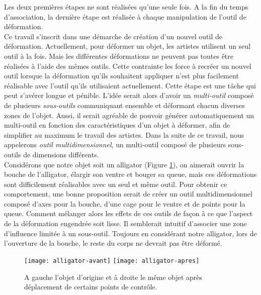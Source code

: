 Les deux premières étapes ne sont réalisées qu'une seule fois. A la fin du
temps d'association, la dernière étape est réalisée à chaque manipulation de
l'outil de déformation. \\

Ce travail s'inscrit dans une démarche de création d'un nouvel outil de
déformation. Actuellement, pour déformer un objet, les artistes utilisent un
seul outil à la fois. Mais les différentes déformations ne peuvent pas toutes
être réalisées à l'aide des mêmes outils. Cette contrainte les force à recréer
un nouvel outil lorsque la déformation qu'ils souhaitent appliquer n'est plus
facilement réalisable avec l'outil qu'ils utilisaient actuellement. Cette
étape est une tâche qui peut s'avérer longue et pénible. L'idée serait alors
d'avoir un \textit {multi-outil} composé de plusieurs \textit{sous-outils}
communiquant ensemble et déformant chacun diverses zones de l'objet. Aussi, il
serait agréable de pouvoir générer automatiquement un multi-outil en fonction
des caractéristiques d'un objet à déformer, afin de simplifier au maximum le
travail des artistes. Dans la suite de ce travail, nous appelerons
\textit{outil multidimensionnel}, un multi-outil composé de plusieurs sous-
outils de dimensions différents. \\

Considérons que notre objet soit un alligator (Figure \ref{INTall}), on
aimerait ouvrir la bouche de l'alligator, élargir son ventre et bouger sa
queue, mais ces déformations sont difficilement réalisables avec un seul et
même outil. Pour obtenir ce comportement, une bonne proposition serait de
créer un outil multidimensionnel composé d'axes pour la bouche, d'une cage
pour le ventre et de points pour la queue. Comment mélanger alors les effets
de ces outils de façon à ce que l'aspect de la déformation engendrée soit
lisse. Il semblerait intuitif d'associer une zone d'influence limitée à un
sous-outil. Toujours en considérant notre alligator, lors de l'ouverture de la
bouche, le reste du corps ne devrait pas être déformé. \\

\begin{figure}[ht]
  \texttt{[image: alligator-avant]}
  \texttt{[image: alligator-apres]}

  \caption[Explication déformation multi-outil]   {A gauche l'objet d'origine
et à droite le même objet après déplacement de certains points de contrôle.}

  \label{INTall}
\end{figure}

